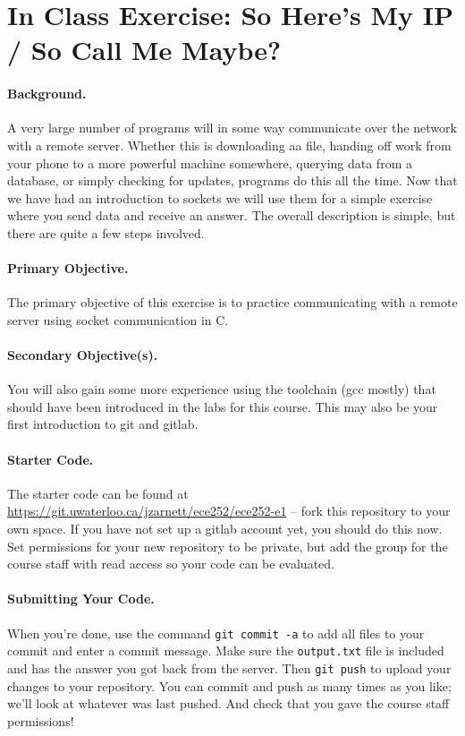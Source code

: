 




\section*{In Class Exercise: So Here's My IP / So Call Me Maybe?}

\paragraph{Background.}
A very large number of programs will in some way communicate over the network with a remote server. Whether this is downloading aa file, handing off work from your phone to a more powerful machine somewhere, querying data from a database, or simply checking for updates, programs do this all the time. Now that we have had an introduction to sockets we will use them for a simple exercise where you send data and receive an answer. The overall description is simple, but there are quite a few steps involved.

\paragraph{Primary Objective.} The primary objective of this exercise is to practice communicating with a remote server using socket communication in C. 

\paragraph{Secondary Objective(s).} You will also gain some more experience using the toolchain (gcc mostly) that should have been introduced in the labs for this course. This may also be your first introduction to git and gitlab.

\paragraph{Starter Code.} The starter code can be found at \url{https://git.uwaterloo.ca/jzarnett/ece252/ece252-e1} -- fork this repository to your own space. If you have not set up a gitlab account yet, you should do this now. Set permissions for your new repository to be private, but add the group for the course staff with read access so your code can be evaluated. 

\paragraph{Submitting Your Code.} When you're done, use the command \texttt{git commit -a} to add all files to your commit and enter a commit message. Make sure the \texttt{output.txt} file is included and has the answer you got back from the server. Then \texttt{git push} to upload your changes to your repository. You can commit and push as many times as you like; we'll look at whatever was last pushed. And check that you gave the course staff permissions!

